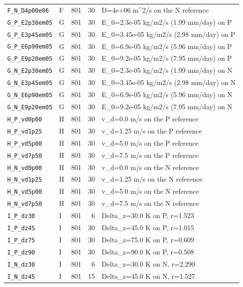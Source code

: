{\begin{longtable}{llrrp{7.0cm}}
\texttt{F\_N\_D4p00e06} & F & 801 & 30 & D=4e+06 m\textasciicircum{}2/s on the N reference\\
\texttt{G\_P\_E2p30em05} & G & 801 & 30 & E\_0=2.3e-05 kg/m2/s (1.99 mm/day) on P\\
\texttt{G\_P\_E3p45em05} & G & 801 & 30 & E\_0=3.45e-05 kg/m2/s (2.98 mm/day) on P\\
\texttt{G\_P\_E6p90em05} & G & 801 & 30 & E\_0=6.9e-05 kg/m2/s (5.96 mm/day) on P\\
\texttt{G\_P\_E9p20em05} & G & 801 & 30 & E\_0=9.2e-05 kg/m2/s (7.95 mm/day) on P\\
\texttt{G\_N\_E2p30em05} & G & 801 & 30 & E\_0=2.3e-05 kg/m2/s (1.99 mm/day) on N\\
\texttt{G\_N\_E3p45em05} & G & 801 & 30 & E\_0=3.45e-05 kg/m2/s (2.98 mm/day) on N\\
\texttt{G\_N\_E6p90em05} & G & 801 & 30 & E\_0=6.9e-05 kg/m2/s (5.96 mm/day) on N\\
\texttt{G\_N\_E9p20em05} & G & 801 & 30 & E\_0=9.2e-05 kg/m2/s (7.95 mm/day) on N\\
\texttt{H\_P\_vd0p00} & H & 801 & 30 & v\_d=0.0 m/s on the P reference\\
\texttt{H\_P\_vd1p25} & H & 801 & 30 & v\_d=1.25 m/s on the P reference\\
\texttt{H\_P\_vd5p00} & H & 801 & 30 & v\_d=5.0 m/s on the P reference\\
\texttt{H\_P\_vd7p50} & H & 801 & 30 & v\_d=7.5 m/s on the P reference\\
\texttt{H\_N\_vd0p00} & H & 801 & 30 & v\_d=0.0 m/s on the N reference\\
\texttt{H\_N\_vd1p25} & H & 801 & 30 & v\_d=1.25 m/s on the N reference\\
\texttt{H\_N\_vd5p00} & H & 801 & 30 & v\_d=5.0 m/s on the N reference\\
\texttt{H\_N\_vd7p50} & H & 801 & 30 & v\_d=7.5 m/s on the N reference\\
\texttt{I\_P\_dz30} & I & 801 & 6 & Delta\_z=30.0 K on P, r=1.523\\
\texttt{I\_P\_dz45} & I & 801 & 30 & Delta\_z=45.0 K on P, r=1.015\\
\texttt{I\_P\_dz75} & I & 801 & 30 & Delta\_z=75.0 K on P, r=0.609\\
\texttt{I\_P\_dz90} & I & 801 & 30 & Delta\_z=90.0 K on P, r=0.508\\
\texttt{I\_N\_dz30} & I & 801 & 6 & Delta\_z=30.0 K on N, r=2.290\\
\texttt{I\_N\_dz45} & I & 801 & 15 & Delta\_z=45.0 K on N, r=1.527\\

\end{longtable}}

